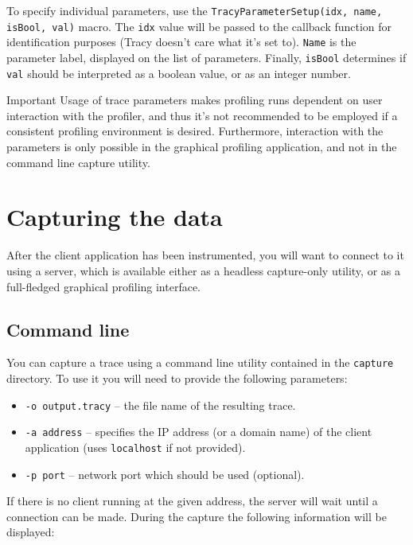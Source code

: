 \documentclass[hidelinks,titlepage,a4paper]{article}
\begin{document}
To specify individual parameters, use the \texttt{TracyParameterSetup(idx, name, isBool, val)} macro. The \texttt{idx} value will be passed to the callback function for identification purposes (Tracy doesn't care what it's set to). \texttt{Name} is the parameter label,  displayed on the list of parameters. Finally, \texttt{isBool} determines if \texttt{val} should be interpreted as a boolean value, or as an integer number.

\begin{bclogo}[
noborder=true,
couleur=black!5,
logo=\bcbombe
]{Important}
Usage of trace parameters makes profiling runs dependent on user interaction with the profiler, and thus it's not recommended to be employed if a consistent profiling environment is desired. Furthermore, interaction with the parameters is only possible in the graphical profiling application, and not in the command line capture utility.
\end{bclogo}

\section{Capturing the data}
\label{capturing}

After the client application has been instrumented, you will want to connect to it using a server, which is available either as a headless capture-only utility, or as a full-fledged graphical profiling interface.

\subsection{Command line}

You can capture a trace using a command line utility contained in the \texttt{capture} directory. To use it you will need to provide the following parameters:

\begin{itemize}
\item \texttt{-o output.tracy} -- the file name of the resulting trace.
\item \texttt{-a address} -- specifies the IP address (or a domain name) of the client application (uses \texttt{localhost} if not provided).
\item \texttt{-p port} -- network port which should be used (optional).
\end{itemize}

If there is no client running at the given address, the server will wait until a connection can be made. During the capture the following information will be displayed:
\end{document}

